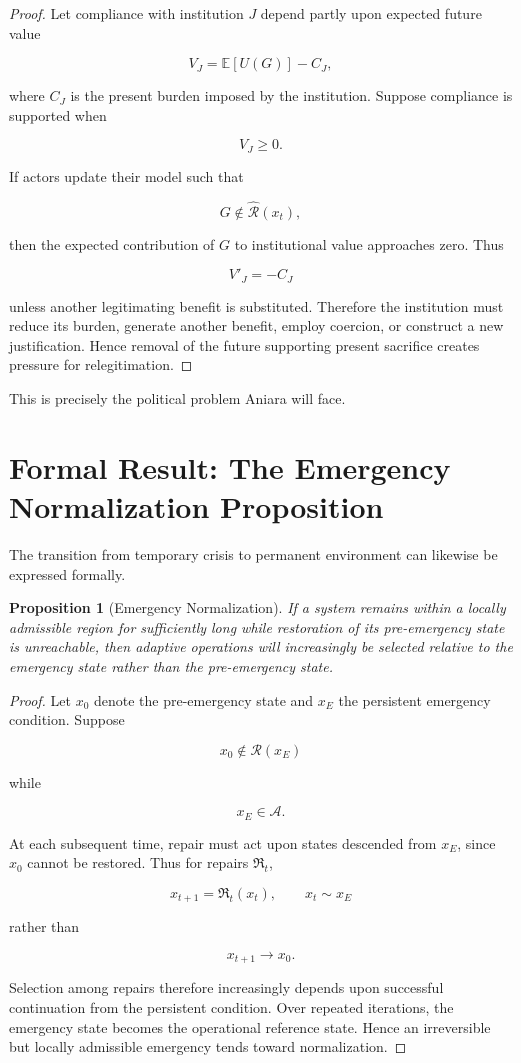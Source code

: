 \documentclass[11pt,oneside]{book}
\newtheorem{proposition}[theorem]{Proposition}
\theoremstyle{definition}
\theoremstyle{remark}
\newcommand{\A}{\mathcal{A}}
\newcommand{\R}{\mathcal{R}}
\newcommand{\Repair}{\mathfrak{R}}
\begin{document}
\begin{proof}
Let compliance with institution \(J\) depend partly upon expected future value

\[
V_J
=
\mathbb E[U(G)]-C_J,
\]

where \(C_J\) is the present burden imposed by the institution. Suppose compliance is supported when

\[
V_J\geq0.
\]

If actors update their model such that

\[
G\notin\widehat{\R}(x_t),
\]

then the expected contribution of \(G\) to institutional value approaches zero. Thus

\[
V'_J
=
-C_J
\]

unless another legitimating benefit is substituted. Therefore the institution must reduce its burden, generate another benefit, employ coercion, or construct a new justification. Hence removal of the future supporting present sacrifice creates pressure for relegitimation.
\end{proof}

This is precisely the political problem Aniara will face.

\section{Formal Result: The Emergency Normalization Proposition}

The transition from temporary crisis to permanent environment can likewise be expressed formally.

\begin{proposition}[Emergency Normalization]
If a system remains within a locally admissible region for sufficiently long while restoration of its pre-emergency state is unreachable, then adaptive operations will increasingly be selected relative to the emergency state rather than the pre-emergency state.
\end{proposition}

\begin{proof}
Let \(x_0\) denote the pre-emergency state and \(x_E\) the persistent emergency condition. Suppose

\[
x_0\notin\R(x_E)
\]

while

\[
x_E\in\A.
\]

At each subsequent time, repair must act upon states descended from \(x_E\), since \(x_0\) cannot be restored. Thus for repairs \(\Repair_t\),

\[
x_{t+1}
=
\Repair_t(x_t),
\qquad
x_t\sim x_E
\]

rather than

\[
x_{t+1}\rightarrow x_0.
\]

Selection among repairs therefore increasingly depends upon successful continuation from the persistent condition. Over repeated iterations, the emergency state becomes the operational reference state. Hence an irreversible but locally admissible emergency tends toward normalization.
\end{proof}
\end{document}

